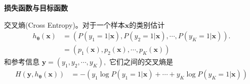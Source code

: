 \documentclass{beamer}%
\begin{document}
\begin{frame}
    \vspace{-0.1cm}
    {\noindent\large\textbf{损失函数与目标函数}}
    \vspace{0.4cm}

    交叉熵(Cross Entropy)。对于一个样本$\mathbf{x}$的类别估计
    {\setlength\abovedisplayskip{0.1cm}
    \setlength\belowdisplayskip{0.1cm}
    \begin{equation*}
        \begin{split}
            h_{\mathbf{\theta}}(\mathbf{x}) &= (P(y_1=1|\mathbf{x}), P(y_2=1|\mathbf{x}), \cdots, P(y_K=1|\mathbf{x})).\\
            &= (p_1 (\mathbf{x}), p_2 (\mathbf{x}), \cdots, p_K(\mathbf{x}))
        \end{split}
    \end{equation*}
    }
    和参考信息
    $\mathbf{y} = (y_1, y_2, \cdots, y_K),$
    它们之间的交叉熵是
    {\setlength\abovedisplayskip{0.1cm}
    \setlength\belowdisplayskip{0.1cm}
    \begin{equation}\label{equ:cross_entropy}
        \begin{split}
            H(\mathbf{y}, h_{\mathbf{\theta}}(\mathbf{x})) &= -(y_1 \log P(y_1=1|\mathbf{x}) + \cdots + y_K \log P(y_K =1|\mathbf{x}))%
        \end{split}
    \end{equation}
    }



\end{frame}
\end{document}
